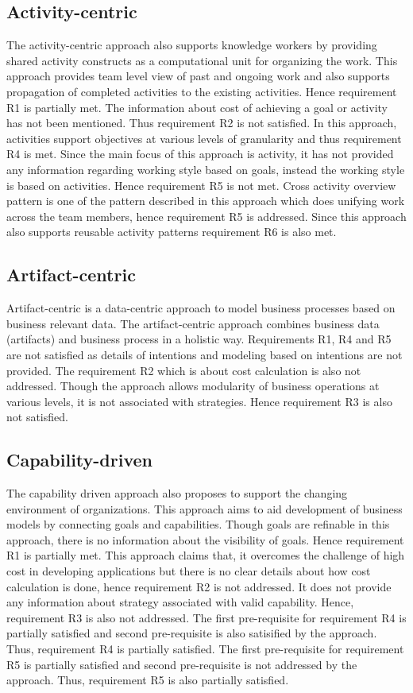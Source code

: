 \subsection{Activity-centric} 
The activity-centric approach also supports knowledge workers by providing shared activity constructs as a computational unit for organizing the work. This approach provides team level view of past and ongoing work and also supports propagation of completed activities to the existing activities. Hence requirement R1 is partially met. The information about cost of achieving a goal or activity has not been mentioned. Thus requirement R2 is not satisfied. In this approach, activities support objectives at various levels of granularity and thus requirement R4 is met. Since the main focus of this approach is activity, it has not provided any information regarding working style based on goals, instead the working style is based on activities. Hence requirement R5 is not met. Cross activity overview pattern is one of the pattern described in this approach which does unifying work across the team members, hence requirement R5 is addressed. Since this approach also supports reusable activity patterns requirement R6 is also met. 
 

\subsection{Artifact-centric} 
Artifact-centric is a data-centric approach to model business processes based on business relevant data. The artifact-centric approach combines business data (artifacts) and business process in a holistic way. Requirements R1, R4 and R5 are not satisfied as details of intentions and modeling based on intentions are not provided. The requirement R2 which is about cost calculation is also not addressed. Though the approach allows modularity of business operations at various levels, it is not associated with strategies. Hence requirement R3 is also not satisfied. 

\subsection{Capability-driven} 
The capability driven approach also proposes to support the changing environment of organizations. This approach aims to aid development of business models by connecting goals and capabilities. Though goals are refinable in this approach, there is no information about the visibility of goals. Hence requirement R1 is partially met. This approach claims that, it overcomes the challenge of high cost in developing applications but there is no clear details about how cost calculation is done, hence requirement R2 is not addressed. It does not provide any information about strategy associated with valid capability. Hence, requirement R3 is also not addressed. The first pre-requisite for requirement R4 is partially satisfied and second pre-requisite is also satisified by the approach. Thus, requirement R4 is partially satisfied. The first pre-requisite for requirement R5 is partially satisfied and second pre-requisite is not addressed by the approach. Thus, requirement R5 is also partially satisfied. 

